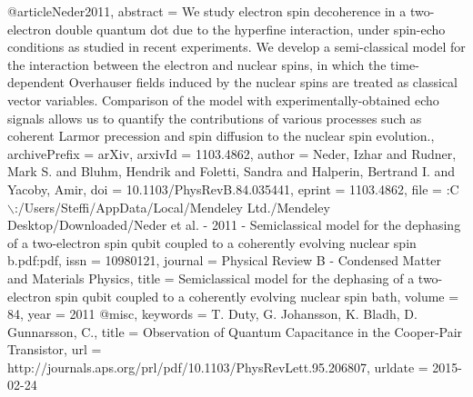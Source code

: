 @article{Neder2011,
abstract = {We study electron spin decoherence in a two-electron double quantum dot due to the hyperfine interaction, under spin-echo conditions as studied in recent experiments. We develop a semi-classical model for the interaction between the electron and nuclear spins, in which the time-dependent Overhauser fields induced by the nuclear spins are treated as classical vector variables. Comparison of the model with experimentally-obtained echo signals allows us to quantify the contributions of various processes such as coherent Larmor precession and spin diffusion to the nuclear spin evolution.},
archivePrefix = {arXiv},
arxivId = {1103.4862},
author = {Neder, Izhar and Rudner, Mark S. and Bluhm, Hendrik and Foletti, Sandra and Halperin, Bertrand I. and Yacoby, Amir},
doi = {10.1103/PhysRevB.84.035441},
eprint = {1103.4862},
file = {:C$\backslash$:/Users/Steffi/AppData/Local/Mendeley Ltd./Mendeley Desktop/Downloaded/Neder et al. - 2011 - Semiclassical model for the dephasing of a two-electron spin qubit coupled to a coherently evolving nuclear spin b.pdf:pdf},
issn = {10980121},
journal = {Physical Review B - Condensed Matter and Materials Physics},
title = {{Semiclassical model for the dephasing of a two-electron spin qubit coupled to a coherently evolving nuclear spin bath}},
volume = {84},
year = {2011}
}
@misc{,
keywords = {T. Duty, G. Johansson, K. Bladh, D. Gunnarsson, C.},
title = {{Observation of Quantum Capacitance in the Cooper-Pair Transistor}},
url = {http://journals.aps.org/prl/pdf/10.1103/PhysRevLett.95.206807},
urldate = {2015-02-24}
}
